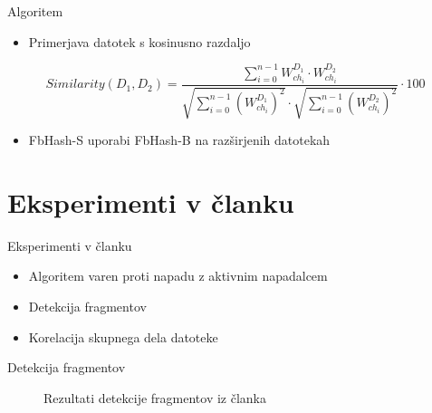 \documentclass[xcolor=dvipsnames,compress]{beamer}
\begin{document}
\begin{frame}{Algoritem}
    \begin{itemize}
    \item Primerjava datotek s kosinusno razdaljo
    \end{itemize}
   \[Similarity(D_1, D_2)=\frac{\sum_{i=0}^{n-1} W_{ch_i}^{D_1} \cdot W_{ch_i}^{D_2}}{\sqrt{\sum_{i=0}^{n-1} (W_{ch_i}^{D_1})^2}\cdot\sqrt{\sum_{i=0}^{n-1} (W_{ch_i}^{D_2})^2}}\cdot 100\]
   \begin{itemize}
    \item FbHash-S uporabi FbHash-B na razširjenih datotekah
    \end{itemize}
\end{frame}

\section{Eksperimenti v članku}
\label{sec:eksoni}

\begin{frame}{Eksperimenti v članku}
    \begin{itemize}
    \item Algoritem varen proti napadu z aktivnim napadalcem
    \item Detekcija fragmentov
    \item Korelacija skupnega dela datoteke
    \end{itemize}
\end{frame}

\begin{frame}{Detekcija fragmentov}
   \begin{figure}[ht!]
        \label{fig:subfigures}
        \begin{center}
        \end{center}
       \caption{Rezultati detekcije fragmentov iz članka}
    \end{figure}
\end{frame}
\end{document}
